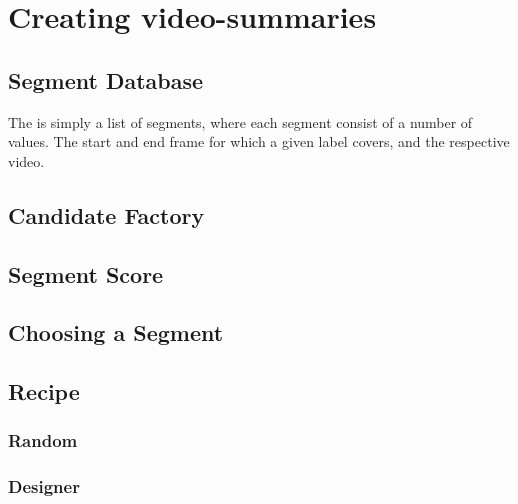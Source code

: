 %
\section{Creating video-summaries}
%

%
\subsection{Segment Database}
%
The is simply a list of segments, where each segment consist of a number of values. The start and end frame for which a given label covers, and the respective video.
%
\subsection{Candidate Factory}
%

%
\subsection{Segment Score}
%

%
\subsection{Choosing a Segment}
%

%
\subsection{Recipe}
%

%
\subsubsection{Random}
%

%
\subsubsection{Designer}
%